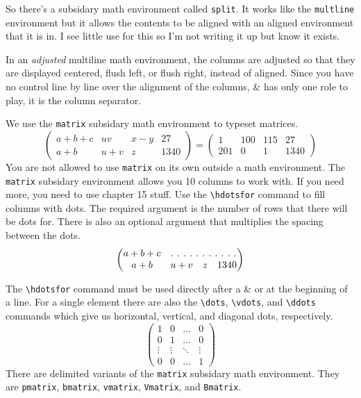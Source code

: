 \documentclass[12pt]{amsart}
\begin{document}
So there's a subsidary math environment called \texttt{split}. It works like the \texttt{multline} environment but it allows the contents to be aligned with an aligned environment that it is in. I see little use for this so I'm not writing it up but know it exists.
\vspace{15 pt}

In an \emph{adjusted} multiline math environment, the columns are adjusted so that they are displayed centered, flush left, or flush right, instead of aligned. Since you have no control line by line over the alignment of the columns, \& has only one role to play, it is the column separator.

We use the \texttt{matrix} subsidary math environment to typeset matrices.
\begin{equation*}
   \left(
   \begin{matrix}
      a + b + c 	& uv 	& x - y 	& 27 \\
      a + b 	& u + v & z 	& 1340
   \end{matrix}
   \right) = 
   \left(
   \begin{matrix}
      1	& 100 	& 115	& 27 \\
      201 & 0	& 1	& 1340 
   \end{matrix}
   \right)
\end{equation*}
You are not allowed to use \texttt{matrix} on its own outside a math environment. The \texttt{matrix} subsidary environment allows you 10 columns to work with. If you need more, you need to use chapter 15 stuff. Use the \verb+\hdotsfor+ command to fill columns with dots. The required argument is the number of rows that there will be dots for. There is also an optional argument that multiplies the spacing between the dots. 
\begin{equation*}
   \left(
   \begin{matrix}
      a + b + c 	&\hdotsfor[2]{3} \\
      a + b 	& u + v & z 	& 1340
   \end{matrix}
   \right)
\end{equation*}

The \verb+\hdotsfor+ command must be used directly after a \& or at the beginning of a line. For a single element there are also the \verb+\dots+, \verb+\vdots+, and \verb+\ddots+ commands which give us horizontal, vertical, and diagonal dots, respectively.
\begin{equation*}
   \left(
   \begin{matrix}
      1		& 0		& \dots 	& 0 \\
      0 		& 1 		& \dots 	& 0 \\
      \vdots 	& \vdots 	& \ddots 	& \vdots \\
      0 		& 0 		& \dots 	& 1
   \end{matrix}
   \right)
\end{equation*}
There are delimited variants of the \texttt{matrix} subsidary math environment. They are \texttt{pmatrix}, \texttt{bmatrix}, \texttt{vmatrix}, \texttt{Vmatrix}, and \texttt{Bmatrix}.
\end{document}
